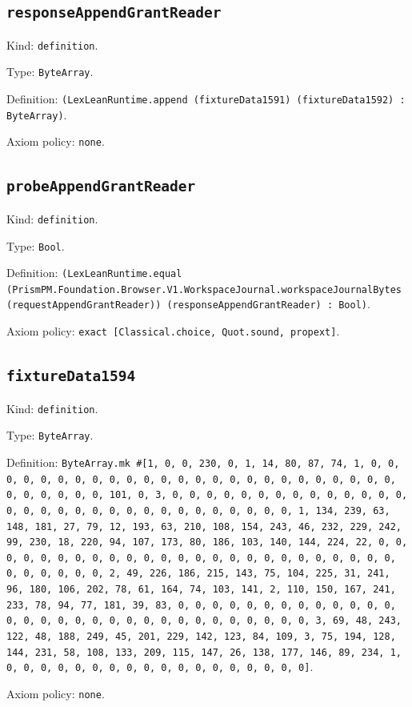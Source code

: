 \documentclass[11pt]{article}
\begin{document}
\subsection*{\texttt{responseAppendGrantReader}}
\noindent Kind: \texttt{definition}.\par
\noindent Type: \texttt{ByteArray}.\par
\noindent Definition: \texttt{(LexLeanRuntime.append (fixtureData1591) (fixtureData1592) : ByteArray)}.\par
\noindent Axiom policy: \texttt{none}.\par
\subsection*{\texttt{probeAppendGrantReader}}
\noindent Kind: \texttt{definition}.\par
\noindent Type: \texttt{Bool}.\par
\noindent Definition: \texttt{(LexLeanRuntime.equal (PrismPM.Foundation.Browser.V1.WorkspaceJournal.workspaceJournalBytes (requestAppendGrantReader)) (responseAppendGrantReader) : Bool)}.\par
\noindent Axiom policy: \texttt{exact [Classical.choice, Quot.sound, propext]}.\par
\subsection*{\texttt{fixtureData1594}}
\noindent Kind: \texttt{definition}.\par
\noindent Type: \texttt{ByteArray}.\par
\noindent Definition: \texttt{ByteArray.mk \#[1, 0, 0, 230, 0, 1, 14, 80, 87, 74, 1, 0, 0, 0, 0, 0, 0, 0, 0, 0, 0, 0, 0, 0, 0, 0, 0, 0, 0, 0, 0, 0, 0, 0, 0, 0, 0, 0, 0, 0, 0, 0, 101, 0, 3, 0, 0, 0, 0, 0, 0, 0, 0, 0, 0, 0, 0, 0, 0, 0, 0, 0, 0, 0, 0, 0, 0, 0, 0, 0, 0, 0, 0, 0, 0, 0, 1, 134, 239, 63, 148, 181, 27, 79, 12, 193, 63, 210, 108, 154, 243, 46, 232, 229, 242, 99, 230, 18, 220, 94, 107, 173, 80, 186, 103, 140, 144, 224, 22, 0, 0, 0, 0, 0, 0, 0, 0, 0, 0, 0, 0, 0, 0, 0, 0, 0, 0, 0, 0, 0, 0, 0, 0, 0, 0, 0, 0, 0, 0, 0, 2, 49, 226, 186, 215, 143, 75, 104, 225, 31, 241, 96, 180, 106, 202, 78, 61, 164, 74, 103, 141, 2, 110, 150, 167, 241, 233, 78, 94, 77, 181, 39, 83, 0, 0, 0, 0, 0, 0, 0, 0, 0, 0, 0, 0, 0, 0, 0, 0, 0, 0, 0, 0, 0, 0, 0, 0, 0, 0, 0, 0, 0, 0, 0, 3, 69, 48, 243, 122, 48, 188, 249, 45, 201, 229, 142, 123, 84, 109, 3, 75, 194, 128, 144, 231, 58, 108, 133, 209, 115, 147, 26, 138, 177, 146, 89, 234, 1, 0, 0, 0, 0, 0, 0, 0, 0, 0, 0, 0, 0, 0, 0, 0, 0, 0, 0]}.\par
\noindent Axiom policy: \texttt{none}.\par
\end{document}
